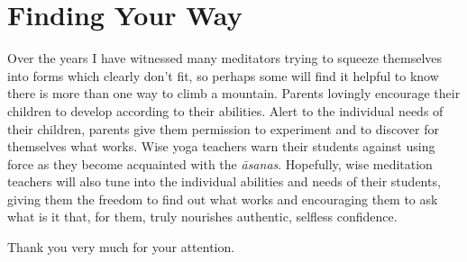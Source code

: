 \section{Finding Your Way}

Over the years I have witnessed many meditators trying to squeeze
themselves into forms which clearly don’t fit, so perhaps some will find
it helpful to know there is more than one way to climb a mountain.
Parents lovingly encourage their children to develop according to their
abilities. Alert to the individual needs of their children, parents give
them permission to experiment and to discover for themselves what works.
Wise yoga teachers warn their students against using force as they
become acquainted with the \emph{āsanas}. Hopefully, wise meditation teachers
will also tune into the individual abilities and needs of their
students, giving them the freedom to find out what works and encouraging
them to ask what is it that, for them, truly nourishes authentic,
selfless confidence.

Thank you very much for your attention.

